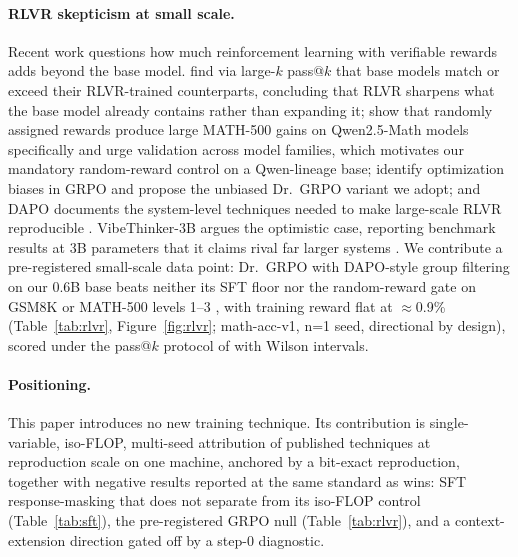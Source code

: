 \paragraph{RLVR skepticism at small scale.}
Recent work questions how much reinforcement learning with verifiable rewards adds beyond the base model. \citet{yue2025does} find via large-$k$ pass@$k$ that base models match or exceed their RLVR-trained counterparts, concluding that RLVR sharpens what the base model already contains rather than expanding it; \citet{shao2025spurious} show that randomly assigned rewards produce large MATH-500 gains on Qwen2.5-Math models specifically and urge validation across model families, which motivates our mandatory random-reward control on a Qwen-lineage base; \citet{liu2025understanding} identify optimization biases in GRPO and propose the unbiased Dr.~GRPO variant we adopt; and DAPO documents the system-level techniques needed to make large-scale RLVR reproducible \citep{yu2025dapo}. VibeThinker-3B argues the optimistic case, reporting benchmark results at 3B parameters that it claims rival far larger systems \citep{xu2026vibethinker}. We contribute a pre-registered small-scale data point: Dr.~GRPO with DAPO-style group filtering on our 0.6B base beats neither its SFT floor nor the random-reward gate on GSM8K \citep{cobbe2021training} or MATH-500 levels 1--3 \citep{hendrycks2021measuring}, with training reward flat at $\approx$0.9\% (Table~\ref{tab:rlvr}, Figure~\ref{fig:rlvr}; math-acc-v1, n=1 seed, directional by design), scored under the pass@$k$ protocol of \citet{chen2021evaluating} with Wilson intervals.

\paragraph{Positioning.}
This paper introduces no new training technique. Its contribution is single-variable, iso-FLOP, multi-seed attribution of published techniques at reproduction scale on one machine, anchored by a bit-exact reproduction, together with negative results reported at the same standard as wins: SFT response-masking that does not separate from its iso-FLOP control (Table~\ref{tab:sft}), the pre-registered GRPO null (Table~\ref{tab:rlvr}), and a context-extension direction gated off by a step-0 diagnostic.
